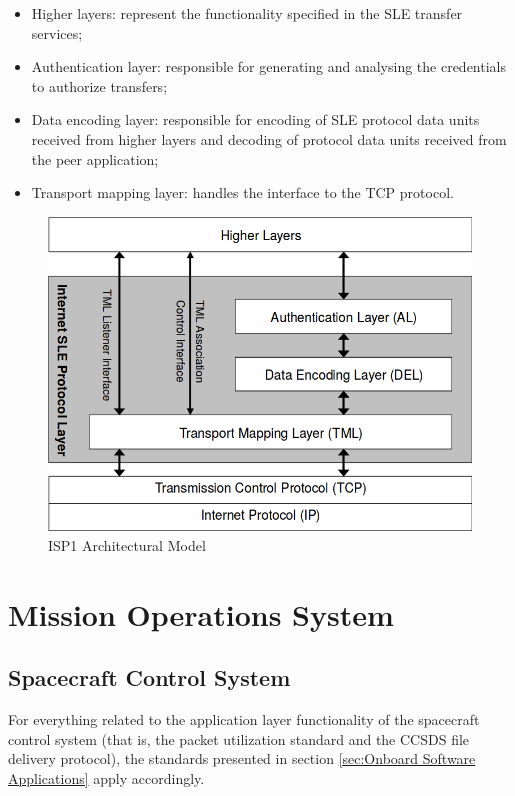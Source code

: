\begin{itemize}
\item Higher layers: represent the functionality specified in the SLE transfer services;
\item Authentication layer: responsible for generating and analysing the credentials to authorize transfers;
\item Data encoding layer: responsible for encoding of SLE protocol data units received from higher layers and decoding of protocol data units received from the peer application;
\item Transport mapping layer: handles the interface to the TCP protocol.
\end{itemize}

\begin{figure}[h]
\centering\includegraphics[scale=0.4]{fig/isp1_architectural_model}
\caption{ISP1 Architectural Model}
\label{fig:ISP1 Architectural Model}
\end{figure}

\section{Mission Operations System}

\subsection{Spacecraft Control System}

For everything related to the application layer functionality of the spacecraft control system (that is, the packet utilization standard and the CCSDS file delivery protocol), the standards presented in section \ref{sec:Onboard Software Applications} apply accordingly.

